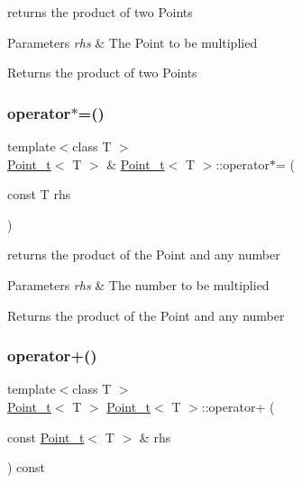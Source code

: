 returns the product of two Points 


\begin{DoxyParams}{Parameters}
{\em rhs} & The Point to be multiplied\\
\hline
\end{DoxyParams}
\begin{DoxyReturn}{Returns}
the product of two Points 
\end{DoxyReturn}
\mbox{\label{class_point__t_a0671ae26709b67542a902f4cbf1e2102}} 
\subsubsection{\texorpdfstring{operator$\ast$=()}{operator*=()}\hspace{0.1cm}{\footnotesize\ttfamily [2/2]}}
{\footnotesize\ttfamily template$<$class T $>$ \\
\hyperlink{class_point__t}{Point\+\_\+t}$<$ T $>$ \& \hyperlink{class_point__t}{Point\+\_\+t}$<$ T $>$\+::operator$\ast$= (\begin{DoxyParamCaption}\item[{const T}]{rhs }\end{DoxyParamCaption})}



returns the product of the Point and any number 


\begin{DoxyParams}{Parameters}
{\em rhs} & The number to be multiplied\\
\hline
\end{DoxyParams}
\begin{DoxyReturn}{Returns}
the product of the Point and any number 
\end{DoxyReturn}
\mbox{\label{class_point__t_afac8b7bed8c8b0f6b5bcbbf3ae1362d9}} 
\subsubsection{\texorpdfstring{operator+()}{operator+()}\hspace{0.1cm}{\footnotesize\ttfamily [1/2]}}
{\footnotesize\ttfamily template$<$class T $>$ \\
\hyperlink{class_point__t}{Point\+\_\+t}$<$ T $>$ \hyperlink{class_point__t}{Point\+\_\+t}$<$ T $>$\+::operator+ (\begin{DoxyParamCaption}\item[{const \hyperlink{class_point__t}{Point\+\_\+t}$<$ T $>$ \&}]{rhs }\end{DoxyParamCaption}) const}



